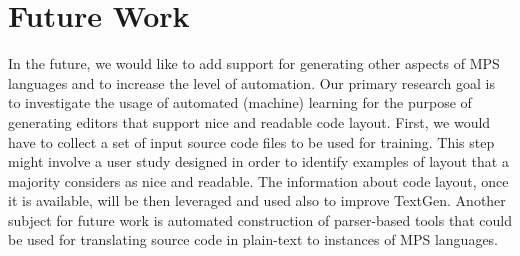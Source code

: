 \section{Future Work}

In the future, we would like to add support for generating other aspects of MPS languages and to increase the level of automation.
Our primary research goal is to investigate the usage of automated (machine) learning for the purpose of generating editors that support nice and readable code layout.
First, we would have to collect a set of input source code files to be used for training. This step might involve a user study designed in order to identify examples of layout that a majority considers as nice and readable.
The information about code layout, once it is available, will be then leveraged and used also to improve TextGen.
Another subject for future work is automated construction of parser-based tools that could be used for translating source code in plain-text to instances of MPS languages.

